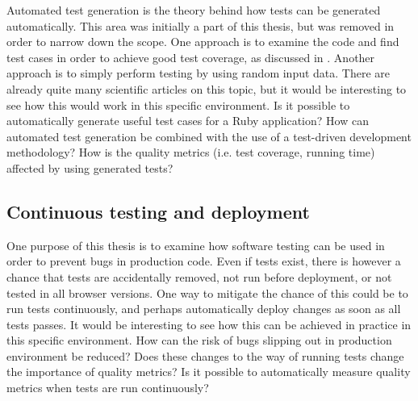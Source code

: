 Automated test generation is the theory behind how tests can be
generated automatically. This area was initially a part of this thesis,
but was removed in order to narrow down the scope. One approach is to
examine the code and find test cases in order to achieve good test
coverage, as discussed in . Another approach
is to simply perform testing by using random input data. There are already
quite many scientific articles on this topic, but it would be
interesting to see how this would work in this specific environment. Is
it possible to automatically generate useful test cases for a Ruby
application? How can automated test generation be combined with the use
of a test-driven development methodology? How is the quality metrics
(i.e. test coverage, running time) affected by using generated tests?\\


\subsection{Continuous testing and deployment}

One purpose of this thesis is to examine how software testing can be
used in order to prevent bugs in production code. Even if tests exist,
there is however a chance that tests are accidentally removed, not run
before deployment, or not tested in all browser versions. One way to
mitigate the chance of this could be to run tests continuously, and
perhaps automatically deploy changes as soon as all tests passes. It
would be interesting to see how this can be achieved in practice in this
specific environment. How can the risk of bugs slipping out in
production environment be reduced? Does these changes to the way of
running tests change the importance of quality metrics? Is it possible
to automatically measure quality metrics when tests are run
continuously?\\

